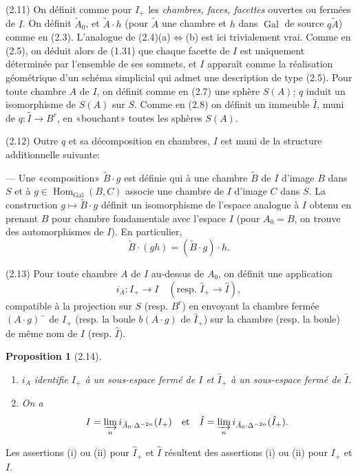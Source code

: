 \documentclass[12pt]{article}
\newtheorem{proposition}[theoreme]{Proposition}
\theoremstyle{remark}
\DeclareMathOperator{\Gal}{Gal}
\DeclareMathOperator{\Hom}{Hom}
\begin{document}
(2.11) On définit comme pour $I_+$ les \emph{chambres, faces, facettes} ouvertes ou fermées de $I$. On définit $\tilde{A}_0$, et $\tilde{A} \cdot h$ (pour $\tilde{A}$ une chambre et $h$ dans $\Gal$ de source $q \tilde{A}$) comme en (2.3). L'analogue de (2.4)(a)$\Leftrightarrow$(b) est ici trivialement vrai. Comme en (2.5), on déduit alors de (1.31) que chaque facette de $I$ est uniquement déterminée par l'ensemble de ses sommets, et $I$ apparaît comme la réalisation géométrique d'un schéma simplicial qui admet une description de type (2.5). Pour toute chambre $A$ de $I$, on définit comme en (2.7) une sphère $S(A)$; $q$ induit un isomorphisme de $S(A)$ sur $S$. Comme en (2.8) on définit un immeuble $\hat{I}$, muni de $q \colon \hat{I} \to B^r$, en «bouchant» toutes les sphères $S(A)$.

(2.12) Outre $q$ et sa décomposition en chambres, $I$ est muni de la structure additionnelle suivante:

--- Une «composition» $\tilde{B} \cdot g$ est définie qui à une chambre $\tilde{B}$ de $I$ d'image $B$ dans $S$ et à $g \in \Hom_{\Gal}(B, C)$ associe une chambre de $I$ d'image $C$ dans $S$. La construction $g \mapsto \tilde{B} \cdot g$ définit un isomorphisme de l'espace analogue à $I$ obtenu en prenant $B$ pour chambre fondamentale avec l'espace $I$ (pour $A_0 = B$, on trouve des automorphismes de $I$). En particulier,
\[\tilde{B} \cdot (gh) = (\tilde{B} \cdot g) \cdot h.\]

(2.13) Pour toute chambre $A$ de $I$ au-dessus de $A_0$, on définit une application
\[i_A \colon I_+ \to I \quad (\text{resp. } \hat{I}_+ \to \hat{I}),\]
compatible à la projection sur $S$ (resp. $B^r$) en envoyant la chambre fermée $(A \cdot g)^-$ de $I_+$ (resp. la boule $b(A \cdot g)$ de $\hat{I}_+$) sur la chambre (resp. la boule) de même nom de $I$ (resp. $\hat{I}$).

\begin{proposition}[2.14]
\begin{enumerate}
\item[(i)] $i_A$ identifie $I_+$ à un sous-espace fermé de $I$ et $\hat{I}_+$ à un sous-espace fermé de $\hat{I}$.
\item[(ii)] On a
\[I = \varinjlim_n i_{\tilde{A}_0 \cdot \Delta^{-2n}}(I_+) \quad \text{et} \quad \hat{I} = \varinjlim_n i_{\tilde{A}_0 \cdot \Delta^{-2n}}(\hat{I}_+).\]
\end{enumerate}
\end{proposition}

Les assertions (i) ou (ii) pour $\hat{I}_+$ et $\hat{I}$ résultent des assertions (i) ou (ii) pour $I_+$ et $I$.
\end{document}
